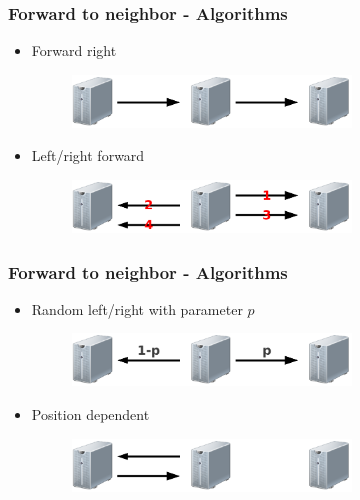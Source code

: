 \documentclass[compress]{beamer}
\begin{document}
\begin{frame}
\frametitle{Forward to neighbor - Algorithms}
\begin{itemize}
 \item Forward right \begin{figure}[h!tb]
 \includegraphics[width=0.7\textwidth]{../resources/p_forwardright.pdf}
 \end{figure}
 \item Left/right forward \begin{figure}[h!tb]
 \includegraphics[width=0.7\textwidth]{../resources/p_forwardleftright.pdf}
 \end{figure}
\end{itemize}
\end{frame}

\begin{frame}
\frametitle{Forward to neighbor - Algorithms}
\begin{itemize}
 \item Random left/right with parameter $p$ \begin{figure}[h!tb]
 \includegraphics[width=0.7\textwidth]{../resources/p_randforward.pdf}
 \end{figure}
 \item Position dependent \begin{figure}[h!tb]
 \includegraphics[width=0.7\textwidth]{../resources/p_position.pdf}
 \end{figure}
\end{itemize}
\end{frame}
\end{document}

